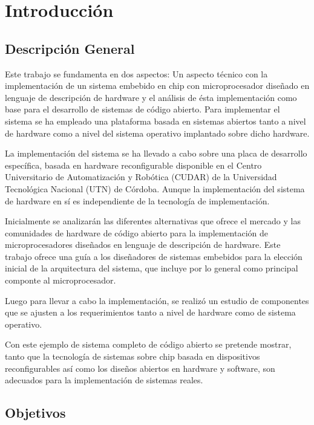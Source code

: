\chapter{Introducción}

\section{Descripción General}
\par
Este trabajo se fundamenta en dos aspectos: Un aspecto técnico con la implementación de un sistema embebido en chip con microprocesador diseñado
en lenguaje de descripción de hardware y el análisis de ésta implementación como base para el desarrollo de sistemas de código abierto.
Para implementar el sistema se ha empleado una plataforma basada en sistemas abiertos tanto a nivel de hardware como a nivel del sistema operativo
implantado sobre dicho hardware.
\vspace{0.5cm}
\par
La implementación del sistema se ha llevado a cabo sobre una placa de desarrollo específica, basada en hardware reconfigurable disponible en el
Centro Universitario de Automatización y Robótica (CUDAR) de la Universidad Tecnológica Nacional (UTN) de Córdoba. Aunque la implementación del
sistema de hardware en sí es independiente de la tecnología de implementación.
\vspace{0.5cm}
\par
Inicialmente se analizarán las diferentes alternativas que ofrece el mercado y las comunidades de hardware de código abierto para la
implementación de microprocesadores diseñados en lenguaje de descripción de hardware. Este trabajo ofrece una guía a los diseñadores de
sistemas embebidos para la elección inicial de la arquitectura del sistema, que incluye por lo general como principal componte al microprocesador.
\vspace{0.5cm}
\par
Luego para llevar a cabo la implementación, se realizó un estudio de componentes que se ajusten a los requerimientos tanto a nivel de hardware como
de sistema operativo.
\vspace{0.5cm}
\par
Con este ejemplo de sistema completo de código abierto se pretende mostrar, tanto que la tecnología de sistemas sobre chip basada en dispositivos
reconfigurables así como los diseños abiertos en hardware y software, son adecuados para la implementación de sistemas reales.

\section{Objetivos}
